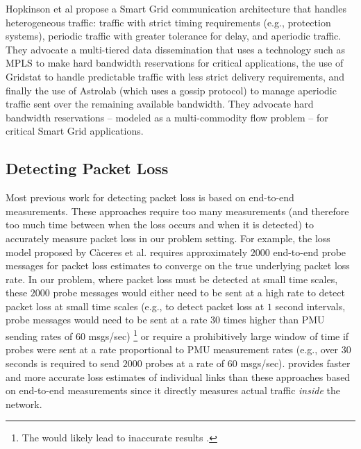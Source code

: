 Hopkinson et al \cite{Hopkinson09} propose a Smart Grid communication architecture that handles heterogeneous traffic: traffic with strict timing requirements (e.g., protection systems), 
periodic traffic with greater tolerance for delay, and aperiodic traffic. They advocate a multi-tiered data dissemination that uses a technology such as MPLS to make hard
bandwidth reservations for critical applications, the use of Gridstat to handle predictable traffic with less strict delivery requirements, and finally the use of Astrolab (which uses a gossip protocol) 
to manage aperiodic traffic sent over the remaining available bandwidth. They advocate hard bandwidth reservations -- modeled as a multi-commodity flow problem -- for critical Smart
Grid applications.



\subsection{Detecting Packet Loss}
\label{subsec:related-detection}

Most previous work for detecting packet loss \cite{Almes99,Caceres99} is based on end-to-end measurements.  These approaches require too many measurements (and therefore too much time 
between when the loss occurs and when it is detected) to accurately
measure packet loss in our problem setting. For example, the loss model proposed by C\`{a}ceres et al. \cite{Caceres99} requires approximately $2000$ end-to-end probe messages for 
packet loss estimates to converge on the true underlying packet loss rate.  In our problem, where packet loss must be detected at small time scales, these $2000$ probe messages 
would either need to be sent at a high rate to detect packet loss at small time scales (e.g., to detect packet loss at $1$ second intervals, probe messages would need to be sent at a rate 
$30$ times higher than PMU sending rates of $60$ msgs/sec) \footnote{The would likely lead to inaccurate results \cite{Barford04}.}
or require a prohibitively large window of time if probes were sent at a rate proportional to PMU measurement rates
(e.g., over $30$ seconds is required to send $2000$ probes at a rate of $60$ msgs/sec).   
\pcnt provides faster and more accurate loss estimates of individual links than these approaches based on end-to-end measurements 
since it directly measures actual traffic \emph{inside} the network.


